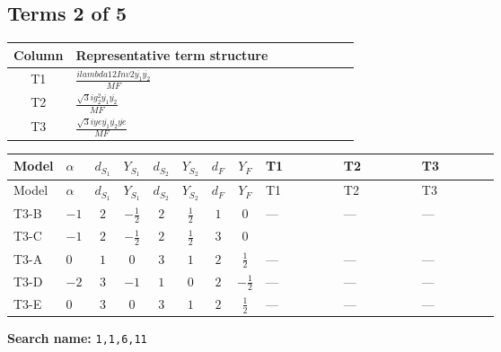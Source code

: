 \documentclass[8pt]{article}
\begin{document}
\begin{landscape}
\subsection*{Terms 2 of 5}
\begin{center}
\begin{tabular}{@{}c >{\raggedright\arraybackslash}p{0.82\linewidth}@{}}
\toprule
Column & Representative term structure \\
\midrule
T1 & \(\displaystyle \frac{i lambda12Inv2 \overline{y_{1}} \overline{y_{2}}}{MF}\) \\
\midrule
T2 & \(\displaystyle \frac{\sqrt{3} i g_{2}^{2} \overline{y_{1}} \overline{y_{2}}}{MF}\) \\
\midrule
T3 & \(\displaystyle \frac{\sqrt{3} i ye \overline{y_{1}} \overline{y_{2}} \overline{ye}}{MF}\) \\
\midrule
\bottomrule
\end{tabular}
\end{center}
\smallskip
\tiny
\begin{longtable}{@{}llcccccc >{\raggedright\arraybackslash}p{0.21\linewidth} >{\raggedright\arraybackslash}p{0.21\linewidth} >{\raggedright\arraybackslash}p{0.21\linewidth}@{}}
\toprule
Model & $\alpha$ & $d_{S_1}$ & $Y_{S_1}$ & $d_{S_2}$ & $Y_{S_2}$ & $d_F$ & $Y_F$ & T1 & T2 & T3 \\
\midrule
\endfirsthead
\toprule
Model & $\alpha$ & $d_{S_1}$ & $Y_{S_1}$ & $d_{S_2}$ & $Y_{S_2}$ & $d_F$ & $Y_F$ & T1 & T2 & T3 \\
\midrule
\endhead
T3-B & $-1$ & $2$ & $-\frac{1}{2}$ & $2$ & $\frac{1}{2}$ & $1$ & $0$ & --- & --- & --- \\
\midrule
T3-C & $-1$ & $2$ & $-\frac{1}{2}$ & $2$ & $\frac{1}{2}$ & $3$ & $0$ & \scriptsize\adjustbox{max width=\linewidth}{$\begin{gathered} - \frac{i lambda12Inv2 \overline{y_{1}} \overline{y_{2}}}{3 MF}\end{gathered}$} & \scriptsize\adjustbox{max width=\linewidth}{$\begin{gathered} - \frac{\sqrt{3} i g_{2}^{2} \overline{y_{1}} \overline{y_{2}}}{4 MF}\end{gathered}$} & \scriptsize\adjustbox{max width=\linewidth}{$\begin{gathered} \frac{\sqrt{3} i ye \overline{y_{1}} \overline{y_{2}} \overline{ye}}{12 MF}\end{gathered}$} \\
\midrule
T3-A & $0$ & $1$ & $0$ & $3$ & $1$ & $2$ & $\frac{1}{2}$ & --- & --- & --- \\
\midrule
T3-D & $-2$ & $3$ & $-1$ & $1$ & $0$ & $2$ & $-\frac{1}{2}$ & --- & --- & --- \\
\midrule
T3-E & $0$ & $3$ & $0$ & $3$ & $1$ & $2$ & $\frac{1}{2}$ & --- & --- & --- \\
\midrule
\bottomrule
\end{longtable}
\clearpage
\noindent\textbf{Search name: }\texttt{1,1,6,11}\par\smallskip

\end{landscape}
\end{document}
